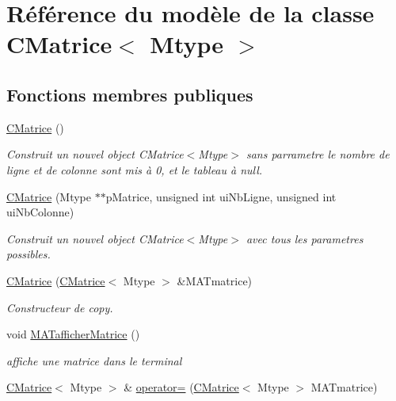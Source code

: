 \hypertarget{classCMatrice}{}\section{Référence du modèle de la classe C\+Matrice$<$ Mtype $>$}
\label{classCMatrice}
\subsection*{Fonctions membres publiques}
\begin{DoxyCompactItemize}
\item 
\mbox{\label{classCMatrice_a5d0995a09020ec499057c486f505fb2b}} 
\hyperlink{classCMatrice_a5d0995a09020ec499057c486f505fb2b}{C\+Matrice} ()
\begin{DoxyCompactList}\small\item\em Construit un nouvel object C\+Matrice$<$\+Mtype$>$ sans parrametre le nombre de ligne et de colonne sont mis à 0, et le tableau à null. \end{DoxyCompactList}\item 
\hyperlink{classCMatrice_ae9e91dd3270e72d4d5787f4ae789a740}{C\+Matrice} (Mtype $\ast$$\ast$p\+Matrice, unsigned int ui\+Nb\+Ligne, unsigned int ui\+Nb\+Colonne)
\begin{DoxyCompactList}\small\item\em Construit un nouvel object C\+Matrice$<$\+Mtype$>$ avec tous les parametres possibles. \end{DoxyCompactList}\item 
\hyperlink{classCMatrice_a2585d9a704eb518ba0b500bc0b5b978a}{C\+Matrice} (\hyperlink{classCMatrice}{C\+Matrice}$<$ Mtype $>$ \&M\+A\+Tmatrice)
\begin{DoxyCompactList}\small\item\em Constructeur de copy. \end{DoxyCompactList}\item 
\mbox{\label{classCMatrice_a448fbaa3f221b599abeb8abf3f289881}} 
void \hyperlink{classCMatrice_a448fbaa3f221b599abeb8abf3f289881}{M\+A\+Tafficher\+Matrice} ()
\begin{DoxyCompactList}\small\item\em affiche une matrice dans le terminal \end{DoxyCompactList}\item 
\hyperlink{classCMatrice}{C\+Matrice}$<$ Mtype $>$ \& \hyperlink{classCMatrice_afe427d425d3204c25faf865d5ba1ef09}{operator=} (\hyperlink{classCMatrice}{C\+Matrice}$<$ Mtype $>$ M\+A\+Tmatrice)
$$
\end{DoxyCompactItemize}
